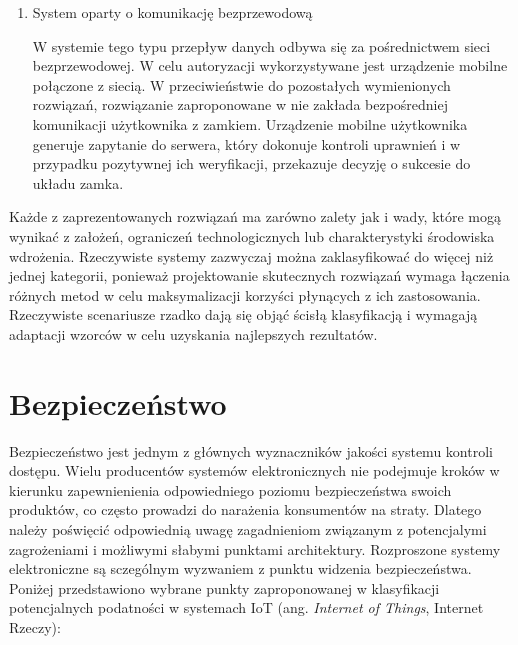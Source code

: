 \begin{enumerate}[label=\Alph*.]
			\item System oparty o komunikację bezprzewodową

				W systemie tego typu przepływ danych odbywa się za pośrednictwem sieci bezprzewodowej. W celu autoryzacji wykorzystywane jest urządzenie mobilne połączone z siecią. W przeciwieństwie do pozostałych wymienionych rozwiązań, rozwiązanie zaproponowane w \cite{cryptographic-iot-access-system} nie zakłada bezpośredniej komunikacji użytkownika z zamkiem. Urządzenie mobilne użytkownika generuje zapytanie do serwera, który dokonuje kontroli uprawnień i w przypadku pozytywnej ich weryfikacji, przekazuje decyzję o sukcesie do układu zamka.


		\end{enumerate}

		Każde z zaprezentowanych rozwiązań ma zarówno zalety jak i wady, które mogą wynikać z założeń, ograniczeń technologicznych lub charakterystyki środowiska wdrożenia. Rzeczywiste systemy zazwyczaj można zaklasyfikować do więcej niż jednej kategorii, ponieważ projektowanie skutecznych rozwiązań wymaga łączenia różnych metod w celu maksymalizacji korzyści płynących z ich zastosowania. Rzeczywiste scenariusze rzadko dają się objąć ścisłą klasyfikacją i wymagają adaptacji wzorców w celu uzyskania najlepszych rezultatów.

	\section{Bezpieczeństwo}

		Bezpieczeństwo jest jednym z głównych wyznaczników jakości systemu kontroli dostępu. Wielu producentów systemów elektronicznych nie podejmuje kroków w kierunku zapewnienienia odpowiedniego poziomu bezpieczeństwa swoich produktów, co często prowadzi do narażenia konsumentów na straty. Dlatego należy poświęcić odpowiednią uwagę zagadnieniom związanym z potencjalymi zagrożeniami i możliwymi słabymi punktami architektury. Rozproszone systemy elektroniczne są sczególnym wyzwaniem z punktu widzenia bezpieczeństwa. Poniżej przedstawiono wybrane punkty zaproponowanej w \cite{iot-vulnerabilities} klasyfikacji potencjalnych podatności w systemach IoT (ang. \textit{Internet of Things}, Internet Rzeczy):
		
